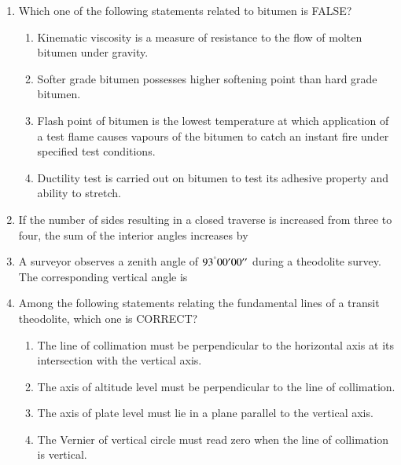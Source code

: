 \documentclass[journal]{IEEEtran}
\begin{document}
\begin{enumerate}
\item Which one of the following statements related to bitumen is FALSE?  
\hfill {}  
\begin{enumerate}
\item Kinematic viscosity is a measure of resistance to the flow of molten bitumen under gravity.  
\item Softer grade bitumen possesses higher softening point than hard grade bitumen.  
\item Flash point of bitumen is the lowest temperature at which application of a test flame causes vapours of the bitumen to catch an instant fire under specified test conditions.  
\item Ductility test is carried out on bitumen to test its adhesive property and ability to stretch.  
\end{enumerate}

\item If the number of sides resulting in a closed traverse is increased from three to four, the sum of the interior angles increases by  
\hfill {}  
\begin{enumerate}
\end{enumerate}

\item A surveyor observes a zenith angle of $93^\degree 00' 00''$ during a theodolite survey. The corresponding vertical angle is  
\hfill {}  
\begin{enumerate}
\end{enumerate}

\item Among the following statements relating the fundamental lines of a transit theodolite, which one is CORRECT?  
\hfill {}  
\begin{enumerate}
\item The line of collimation must be perpendicular to the horizontal axis at its intersection with the vertical axis.  
\item The axis of altitude level must be perpendicular to the line of collimation.  
\item The axis of plate level must lie in a plane parallel to the vertical axis.  
\item The Vernier of vertical circle must read zero when the line of collimation is vertical.  
\end{enumerate}


\end{enumerate}
\end{document}
